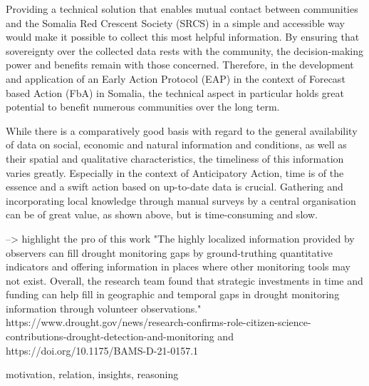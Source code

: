 {%
Providing a technical solution that enables mutual contact between communities and the Somalia Red Crescent Society (SRCS) in a simple and accessible way would make it possible to collect this most helpful information. By ensuring that sovereignty over the collected data rests with the community, the decision-making power and benefits remain with those concerned. Therefore, in the development and application of an Early Action Protocol (EAP) in the context of Forecast based Action (FbA) in Somalia, the technical aspect in particular holds great potential to benefit numerous communities over the long term.

While there is a comparatively good basis with regard to the general availability of data on social, economic and natural information and conditions, as well as their spatial and qualitative characteristics, the timeliness of this information varies greatly. Especially in the context of Anticipatory Action, time is of the essence and a swift action based on up-to-date data is crucial. Gathering and incorporating local knowledge through manual surveys by a central organisation can be of great value, as shown above, but is time-consuming and slow.


--> highlight the pro of this work
"The highly localized information provided by observers can fill drought monitoring gaps by ground-truthing quantitative indicators and offering information in places where other monitoring tools may not exist. Overall, the research team found that strategic investments in time and funding can help fill in geographic and temporal gaps in drought monitoring information through volunteer observations."
https://www.drought.gov/news/research-confirms-role-citizen-science-contributions-drought-detection-and-monitoring and https://doi.org/10.1175/BAMS-D-21-0157.1



motivation, relation, insights, reasoning


}
